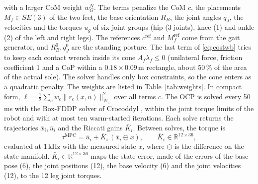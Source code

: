\documentclass[conference]{IEEEtran}
\newcommand{\R}{\mathbb{R}}
\newcommand{\mpc}{\mathrm{MPC}}
\newcommand{\xb}{\bar{x}}
\newcommand{\ub}{\bar{u}}
\begin{document}
with a larger CoM weight $w_G^N$.
The terms penalize the CoM $c$, the placements $M_f\in SE(3)$ of the two feet, the base orientation $R_B$, the joint angles $q_J$, the velocities and the torques $u_g$ of six joint groups (hip (3 joints), knee (1) and ankle (2) of the left and right legs).
The references $c^{\mathrm{ref}}$ and $M_f^{\mathrm{ref}}$ come from the gait generator, and $R_B^0,q_J^0$ are the standing posture.
The last term of \eqref{eq:costwb} tries to keep each contact wrench inside its cone $A_f\lambda_f\le0$ (unilateral force, friction coefficient 1 and a CoP within a $0.18\times0.09$\,m rectangle, about 50\,\% of the area of the actual sole).
The solver handles only box constraints, so the cone enters as a quadratic penalty.
The weights are listed in Table~\ref{tab:weights}.
In compact form, $\ell=\tfrac12\sum_c w_c\|r_c(x,u)\|^2_{W_c}$ over all terms $c$.
The OCP is solved every 50\,ms with the Box-FDDP solver of Crocoddyl \cite{mastalli2020crocoddyl}, within the joint torque limits of the robot and with at most ten warm-started iterations.
Each solve returns the trajectories $\xb_i,\ub_i$ and the Riccati gains $\bar K_i$.
Between solves, the torque is
\begin{equation}
\tau^{\mpc}=\ub_i+\bar K_i\,(\xb_i\ominus x),\qquad \bar K_i\in\R^{12\times36},
\label{eq:riccati}
\end{equation}
evaluated at 1\,kHz with the measured state $x$, where $\ominus$ is the difference on the state manifold.
$\bar K_i\in\R^{12\times36}$ maps the state error, made of the errors of the base pose (6), the joint positions (12), the base velocity (6) and the joint velocities (12), to the 12 leg joint torques.

\begin{table}[t]
\caption{Cost weights of the whole-body MPC}
\label{tab:weights}
\centering
\setlength{\tabcolsep}{3pt}
\end{table}
\end{document}

